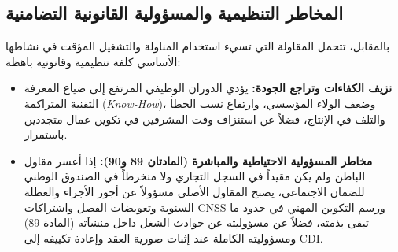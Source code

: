 \subsection{المخاطر التنظيمية والمسؤولية القانونية التضامنية}
بالمقابل، تتحمل المقاولة التي تسيء استخدام المناولة والتشغيل المؤقت في نشاطها الأساسي كلفة تنظيمية وقانونية باهظة:
\begin{itemize}[leftmargin=*, itemsep=5pt]
    \item \textbf{نزيف الكفاءات وتراجع الجودة:} يؤدي الدوران الوظيفي المرتفع إلى ضياع المعرفة التقنية المتراكمة (\textit{Know-How})، وضعف الولاء المؤسسي، وارتفاع نسب الخطأ والتلف في الإنتاج، فضلاً عن استنزاف وقت المشرفين في تكوين عمال متجددين باستمرار.
    \item \textbf{مخاطر المسؤولية الاحتياطية والمباشرة (المادتان \textenglish{89} و\textenglish{90}):} إذا أعسر مقاول الباطن ولم يكن مقيداً في السجل التجاري ولا منخرطاً في الصندوق الوطني للضمان الاجتماعي، يصبح المقاول الأصلي مسؤولاً عن أجور الأجراء والعطلة السنوية وتعويضات الفصل واشتراكات \textenglish{CNSS} ورسم التكوين المهني في حدود ما تبقى بذمته، فضلاً عن مسؤوليته عن حوادث الشغل داخل منشآته (المادة \textenglish{89}) ومسؤوليته الكاملة عند إثبات صورية العقد وإعادة تكييفه إلى \textenglish{CDI}.
\end{itemize}

